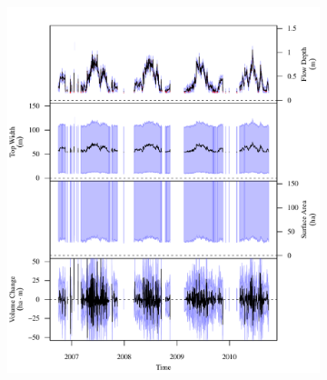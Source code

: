 \begin{linenumbers}
\subfiguremid
\begin{landscape}
	\begin{figure}
		\begin{subfigure}{0.7\textwidth}
			\centering
			\includegraphics[width=\textwidth]{"Figures/Results_USR/Stochastic/G TS C"}
			\label{sub:GeoTS_C}	
		\end{subfigure}%
		\begin{subfigure}{0.7\textwidth}
			\centering			

\end{subfigure}
\end{figure}
\end{landscape}
\end{linenumbers}
